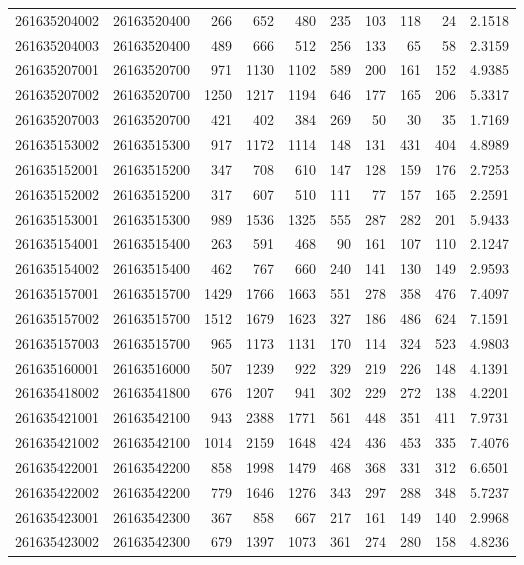 \documentclass[
  11pt,
]{article}
\begin{document}
\begin{longtable}[t]{llrrrrrrrr}
261635204002 & 26163520400 & 266 & 652 & 480 & 235 & 103 & 118 & 24 & 2.1518\\
261635204003 & 26163520400 & 489 & 666 & 512 & 256 & 133 & 65 & 58 & 2.3159\\
261635207001 & 26163520700 & 971 & 1130 & 1102 & 589 & 200 & 161 & 152 & 4.9385\\
261635207002 & 26163520700 & 1250 & 1217 & 1194 & 646 & 177 & 165 & 206 & 5.3317\\
261635207003 & 26163520700 & 421 & 402 & 384 & 269 & 50 & 30 & 35 & 1.7169\\
261635153002 & 26163515300 & 917 & 1172 & 1114 & 148 & 131 & 431 & 404 & 4.8989\\
261635152001 & 26163515200 & 347 & 708 & 610 & 147 & 128 & 159 & 176 & 2.7253\\
261635152002 & 26163515200 & 317 & 607 & 510 & 111 & 77 & 157 & 165 & 2.2591\\
261635153001 & 26163515300 & 989 & 1536 & 1325 & 555 & 287 & 282 & 201 & 5.9433\\
261635154001 & 26163515400 & 263 & 591 & 468 & 90 & 161 & 107 & 110 & 2.1247\\
261635154002 & 26163515400 & 462 & 767 & 660 & 240 & 141 & 130 & 149 & 2.9593\\
261635157001 & 26163515700 & 1429 & 1766 & 1663 & 551 & 278 & 358 & 476 & 7.4097\\
261635157002 & 26163515700 & 1512 & 1679 & 1623 & 327 & 186 & 486 & 624 & 7.1591\\
261635157003 & 26163515700 & 965 & 1173 & 1131 & 170 & 114 & 324 & 523 & 4.9803\\
261635160001 & 26163516000 & 507 & 1239 & 922 & 329 & 219 & 226 & 148 & 4.1391\\
261635418002 & 26163541800 & 676 & 1207 & 941 & 302 & 229 & 272 & 138 & 4.2201\\
261635421001 & 26163542100 & 943 & 2388 & 1771 & 561 & 448 & 351 & 411 & 7.9731\\
261635421002 & 26163542100 & 1014 & 2159 & 1648 & 424 & 436 & 453 & 335 & 7.4076\\
261635422001 & 26163542200 & 858 & 1998 & 1479 & 468 & 368 & 331 & 312 & 6.6501\\
261635422002 & 26163542200 & 779 & 1646 & 1276 & 343 & 297 & 288 & 348 & 5.7237\\
261635423001 & 26163542300 & 367 & 858 & 667 & 217 & 161 & 149 & 140 & 2.9968\\
261635423002 & 26163542300 & 679 & 1397 & 1073 & 361 & 274 & 280 & 158 & 4.8236\\

\end{longtable}
\end{document}
